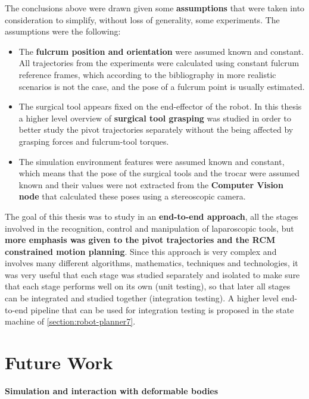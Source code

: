 The conclusions above were drawn given some \textbf{assumptions} that were taken into consideration to simplify, without loss of generality, some experiments. The assumptions were the following:
\begin{itemize}
\item The \textbf{fulcrum position and orientation} were assumed known and constant. All trajectories from the experiments were calculated using constant fulcrum reference frames, which according to the bibliography in more 
realistic scenarios is not the case, and the pose of a fulcrum point is usually estimated.
\item The surgical tool appears fixed on the end-effector of the robot. In this thesis a higher level overview of \textbf{surgical tool grasping} was studied in order to better study the pivot trajectories separately without 
the being affected by grasping forces and fulcrum-tool torques.
\item The simulation environment features were assumed known and constant, which means that the pose of the surgical tools and the trocar were assumed known and their values were not extracted from the \textbf{Computer Vision 
node} that calculated these poses using a stereoscopic camera.
\end{itemize}

The goal of this thesis was to study in an \textbf{end-to-end approach}, all the stages involved in the recognition, control and manipulation of laparoscopic tools, but \textbf{more emphasis was given to the pivot 
trajectories and the RCM constrained motion planning}. Since this approach is very complex and involves many different algorithms, mathematics, techniques and technologies, it was very useful that each stage was studied 
separately and isolated to make sure that each stage performs well on its own (unit testing), so that later all stages can be integrated and studied together (integration testing). A higher level end-to-end pipeline that can 
be used for integration testing is proposed in the state machine of \ref{section:robot-planner7}. \\




\section{Future Work}

\textbf{Simulation and interaction with deformable bodies} \\

